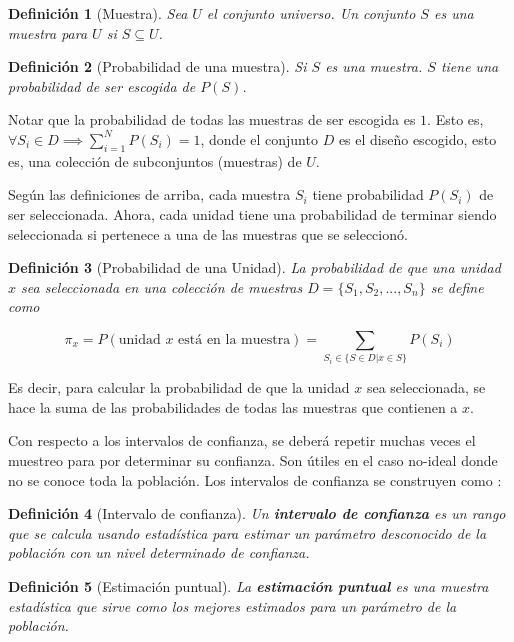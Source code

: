 \documentclass{report}
\newtheorem{definition}{Definición}
\begin{document}
\begin{definition}[Muestra]
    Sea $U$ el conjunto universo. Un conjunto $S$ es una muestra para $U$ si $S \subseteq U$.
\end{definition}

\begin{definition}[Probabilidad de una muestra]
    Si $S$ es una muestra. $S$ tiene una probabilidad de ser escogida de $P(S)$.
\end{definition}

Notar que la probabilidad de todas las muestras de ser escogida es $1$. Esto es, $\forall S_i \in D \implies \sum_{i=1}^{N} P(S_i) = 1$, donde el conjunto $D$ es el diseño escogido, esto es, una colección de subconjuntos (muestras) de $U$.

\bigbreak

Según las definiciones de arriba, cada muestra $S_i$ tiene probabilidad $P(S_i)$ de ser seleccionada. Ahora, cada unidad tiene una probabilidad de terminar siendo seleccionada si pertenece a una de las muestras que se seleccionó.

\begin{definition}[Probabilidad de una Unidad]
    La probabilidad de que una unidad $x$ sea seleccionada en una colección de muestras $D = \{ S_1, S_2, ..., S_n \}$ se define como
    
    $$
    \pi_x = P(\text{unidad $x$ está en la muestra}) = \sum_{S_i \in \{ S \in D | x \in S \}} P(S_i)
    $$
\end{definition}

Es decir, para calcular la probabilidad de que la unidad $x$ sea seleccionada, se hace la suma de las probabilidades de todas las muestras que contienen a $x$.

Con respecto a los intervalos de confianza, se deberá repetir muchas veces el muestreo para por determinar su confianza. Son útiles en el caso no-ideal donde no se conoce toda la población. Los intervalos de confianza se construyen como \cite{the-pennsylvania-state-university-no-date}:

\begin{definition}[Intervalo de confianza]
    Un \textbf{intervalo de confianza} es un rango que se calcula usando estadística para estimar un parámetro desconocido de la población con un nivel determinado de confianza. 
\end{definition}

\begin{definition}[Estimación puntual]
    La \textbf{estimación puntual} es una muestra estadística que sirve como los mejores estimados para un parámetro de la población.
\end{definition}
\end{document}
